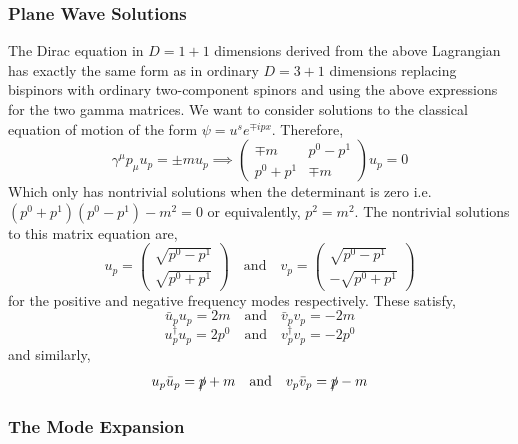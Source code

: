 \documentclass[12pt]{article}
\begin{document}
\subsubsection{Plane Wave Solutions}
The Dirac equation in $D = 1 + 1$ dimensions derived from the above Lagrangian has exactly the same form as in ordinary $D = 3 + 1$ dimensions replacing bispinors with ordinary two-component spinors and using the above expressions for the two gamma matrices. We want to consider solutions to the classical equation of motion of the form $\psi = u^s e^{ \mp i p x}$. Therefore,
\[ \gamma^\mu p_\mu u_p = \pm m u_p \implies 
\begin{pmatrix}
\mp m & p^0 - p^1 
\\
p^0 + p^1 & \mp m
\end{pmatrix} u_p = 0 \] 
Which only has nontrivial solutions when the determinant is zero i.e. $(p^0 + p^1)(p^0 - p^1) - m^2 = 0$ or equivalently, $p^2 = m^2$. The nontrivial solutions to this matrix equation are,
\[ u_p = 
\begin{pmatrix}
\sqrt{p^0 - p^1}
\\
\sqrt{p^0 + p^1}
\end{pmatrix}  \quad \text{and} \quad
v_p = 
\begin{pmatrix}
\sqrt{p^0 - p^1}
\\
-\sqrt{p^0 + p^1}
\end{pmatrix} \]
for the positive and negative frequency modes respectively. These satisfy,  
\[ \bar{u}_p u_p = 2 m \quad \text{and} \quad \bar{v}_p v_p = -2 m\]
\[ u^\dagger_p u_p = 2 p^0 \quad \text{and} \quad v^\dagger_p v_p = -2 p^0\]
and similarly,
\[ u_p \bar{u}_p = \slashed{p} + m \quad \text{and} \quad v_p \bar{v}_p = \slashed{p} - m\]

\subsubsection{The Mode Expansion}
\end{document}
